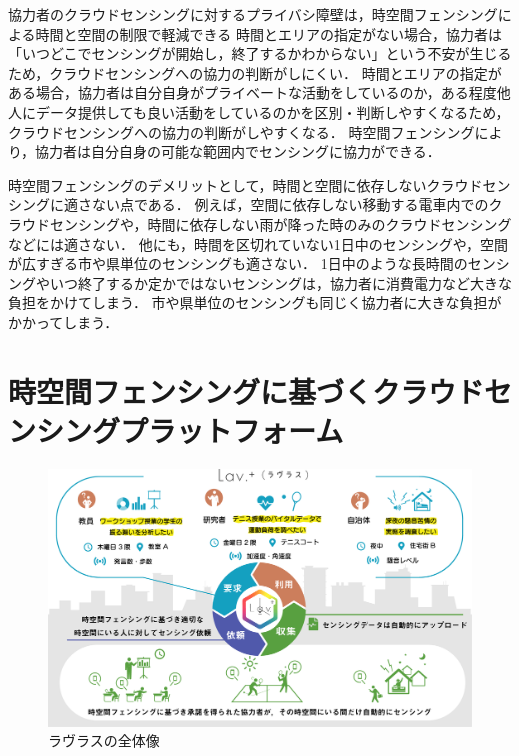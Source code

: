 協力者のクラウドセンシングに対するプライバシ障壁は，時空間フェンシングによる時間と空間の制限で軽減できる
時間とエリアの指定がない場合，協力者は「いつどこでセンシングが開始し，終了するかわからない」という不安が生じるため，クラウドセンシングへの協力の判断がしにくい．
時間とエリアの指定がある場合，協力者は自分自身がプライベートな活動をしているのか，ある程度他人にデータ提供しても良い活動をしているのかを区別・判断しやすくなるため，クラウドセンシングへの協力の判断がしやすくなる．
時空間フェンシングにより，協力者は自分自身の可能な範囲内でセンシングに協力ができる．

時空間フェンシングのデメリットとして，時間と空間に依存しないクラウドセンシングに適さない点である．
例えば，空間に依存しない移動する電車内でのクラウドセンシングや，時間に依存しない雨が降った時のみのクラウドセンシングなどには適さない．
他にも，時間を区切れていない1日中のセンシングや，空間が広すぎる市や県単位のセンシングも適さない．
1日中のような長時間のセンシングやいつ終了するか定かではないセンシングは，協力者に消費電力など大きな負担をかけてしまう．
市や県単位のセンシングも同じく協力者に大きな負担がかかってしまう．

\section{時空間フェンシングに基づくクラウドセンシングプラットフォーム}

\begin{figure}[tbh]
    \centering
    \includegraphics[width=16cm]{img_lavlus.png}
    \caption{ラヴラスの全体像}
    \label{fig:lavlus}
\end{figure}


